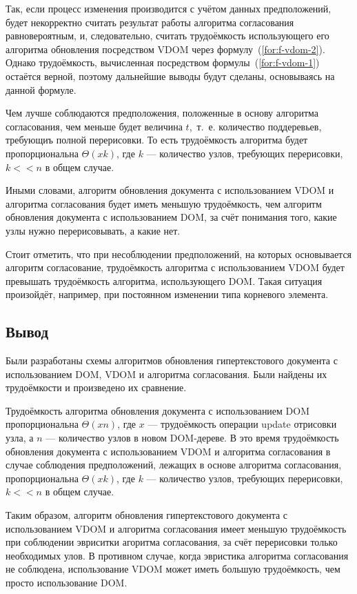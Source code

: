 Так, если процесс изменения производится с учётом данных предположений, будет некорректно считать результат работы алгоритма согласования равновероятным, и, следовательно, считать трудоёмкость использующего его алгоритма обновления посредством VDOM через формулу~(\ref{for:f-vdom-2}). 
Однако трудоёмкость, вычисленная посредством формулы~(\ref{for:f-vdom-1}) остаётся верной, поэтому дальнейшие выводы будут сделаны, основываясь на данной формуле.

Чем лучше соблюдаются предположения, положенные в основу алгоритма согласования, чем меньше будет величина $t$,~т.~е. количество поддеревьев, требующиъ полной перерисовки. 
То есть трудоёмкость алгоритма будет пропорциональна $\Theta(xk)$, где $k$ --- количество узлов, требующих перерисовки, $k << n$ в общем случае.

Иными словами, алгоритм обновления документа с использованием VDOM и алгоритма согласования будет иметь меньшую трудоёмкость, чем алгоритм обновления документа с использованием DOM, за счёт понимания того, какие узлы нужно перерисовывать, а какие нет.

Стоит отметить, что при несоблюдении предположений, на которых основывается алгоритм согласование, трудоёмкость алгоритма с использованием VDOM будет превышать трудоёмкость алгоритма, использующего DOM. 
Такая ситуация произойдёт, например, при постоянном изменении типа корневого элемента.

\subsection*{Вывод}

Были разработаны схемы алгоритмов обновления гипертекстового документа с использованием DOM, VDOM и алгоритма согласования. Были найдены их трудоёмкости и произведено их сравнение.

Трудоёмкость алгоритма обновления документа с использованием DOM пропорциональна $\Theta(xn)$, где $x$ --- трудоёмкость операции update отрисовки узла, а $n$ --- количество узлов в новом DOM-дереве.
В это время трудоёмкость обновления документа с использованием VDOM и алгоритма согласования в случае соблюдения предположений, лежащих в основе алгоритма согласования, пропорциональна $\Theta(xk)$, где $k$ --- количество узлов, требующих перерисовки, $k << n$ в общем случае.

Таким образом, алгоритм обновления гипертекстового документа с использованием VDOM и алгоритма согласования имеет меньшую трудоёмкость при соблюдении эвриситки агоритма согласования, за счёт перерисовки только необходимых улов.
В противном случае, когда эвристика алгоритма согласования не соблюдена, использование VDOM может иметь большую трудоёмкость, чем просто использование DOM.

\pagebreak